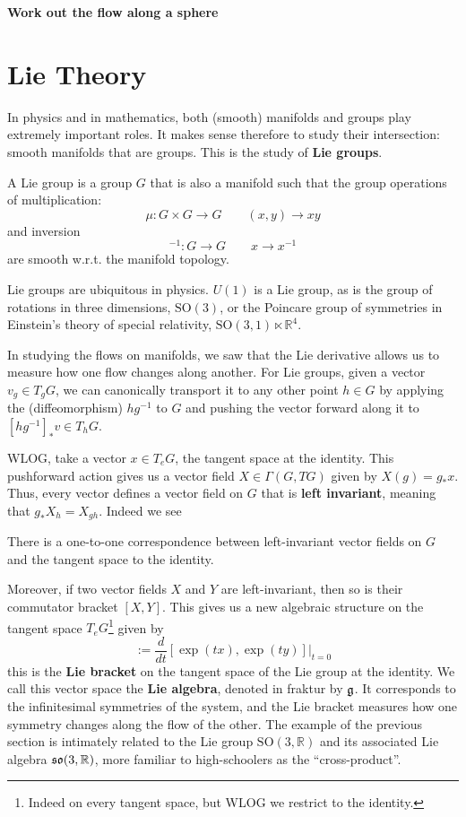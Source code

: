 	\textbf{Work out the flow along a sphere}
	
	
	\section{Lie Theory} %
	\label{sec:lie_theory}
		
		In physics and in mathematics, both (smooth) manifolds and groups play extremely important roles. It makes sense therefore to study their intersection: smooth manifolds that are groups. This is the study of \textbf{Lie groups}.
		\begin{defn}
			A Lie group is a group $G$ that is also a manifold such that the group operations of multiplication:
			$$\mu: G \times G \to G \qquad (x, y) \to xy$$
			and inversion 
			$$^{-1} : G \to G \qquad x \to x^{-1}$$
			are smooth w.r.t. the manifold topology.
		\end{defn}
		
		Lie groups are ubiquitous in physics. $U(1)$ is a Lie group, as is the group of rotations in three dimensions, $\mathrm{SO}(3)$, or the Poincare group of symmetries in Einstein's theory of special relativity, $\mathrm{SO}(3, 1) \ltimes \mathbb R^4$.
		
		In studying the flows on manifolds, we saw that the Lie derivative allows us to measure how one flow changes along another. For Lie groups, given a vector $v_g \in T_g G$, we can canonically transport it to any other point $h \in G$ by applying the (diffeomorphism) $h g^{-1}$ to $G$ and pushing the vector forward along it to $[h g^{-1}]_* v \in T_{h} G$.
		
		WLOG, take a vector $x \in T_e G$, the tangent space at the identity. This pushforward action gives us a vector field $X \in \Gamma(G, TG)$ given by $X(g) = g_* x$. Thus, every vector defines a vector field on $G$ that is \textbf{left invariant}, meaning that $g_* X_h = X_{gh}$. Indeed we see
		\begin{prop}
			There is a one-to-one correspondence between left-invariant vector fields on $G$ and the tangent space to the identity. 
		\end{prop}
		Moreover, if two vector fields $X$ and $Y$ are left-invariant, then so is their commutator bracket $[X, Y]$. This gives us a new algebraic structure on the tangent space $T_e G$\footnote{Indeed on every tangent space, but WLOG we restrict to the identity.} given by 
		\begin{equation}
			[x, y] := \frac{d}{dt} [\exp(tx), \exp(ty)] |_{t = 0}
		\end{equation}
		this is the \textbf{Lie bracket} on the tangent space of the Lie group at the identity. We call this vector space the \textbf{Lie algebra}, denoted in fraktur by $\frak g$. It corresponds to the infinitesimal symmetries of the system, and the Lie bracket measures how one symmetry changes along the flow of the other. The example of the previous section is intimately related to the Lie group $\mathrm{SO}(3, \mathbb R)$ and its associated Lie algebra $\frak{so}(3, \mathbb R)$, more familiar to high-schoolers as the ``cross-product''.
		
